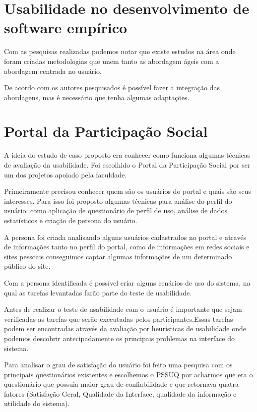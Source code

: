 \section{Usabilidade no desenvolvimento de software empírico}

Com as pesquisas realizadas podemos notar que existe estudos na área onde foram criadas metodologias que unem tanto as abordagem ágeis com a abordagem centrada no usuário.

De acordo com os autores pesquisados é possível fazer a integração das abordagens, mas é necessário que tenha algumas adaptações.


\section{Portal da Participação Social} 

	A ideia do estudo de caso proposto era conhecer como funciona algumas técnicas de avaliação da usabilidade. Foi escolhido o Portal da Participação Social por ser um dos projetos apoiado pela faculdade.

	Primeiramente precisou conhecer quem são os usuários do portal e quais são seus interesses. Para isso foi proposto algumas técnicas para análise do perfil do usuário: como aplicação de questionário de perfil de uso, análise de dados estatísticos e criação de persona do usuário.

	A persona foi criada analisando alguns usuários cadastrados no portal e através de informações tanto no perfil do portal, como de informações em redes sociais e sites pessoais conseguimos captar algumas informações de um determinado público do site.

	Com a persona identificada é possível criar alguns cenários de uso do sistema, na qual as tarefas levantadas farão parte do teste de usabilidade.

	Antes de realizar o teste de usabilidade com o usuário é importante que sejam verificadas as tarefas que serão executadas pelos participantes.Essas tarefas podem ser encontradas através da avaliação por heurísticas de usabilidade onde podemos descobrir antecipadamente os principais problemas na interface do sistema.

	Para analisar o grau de satisfação do usuário foi feito uma pesquisa com os principais questionários existentes e escolhemos o PSSUQ por acharmos que era o questionário que possuia maior grau de confiabilidade e que retornava quatra fatores (Satisfação Geral, Qualidade da Interface, qualidade da informação e utilidade do sistema).

